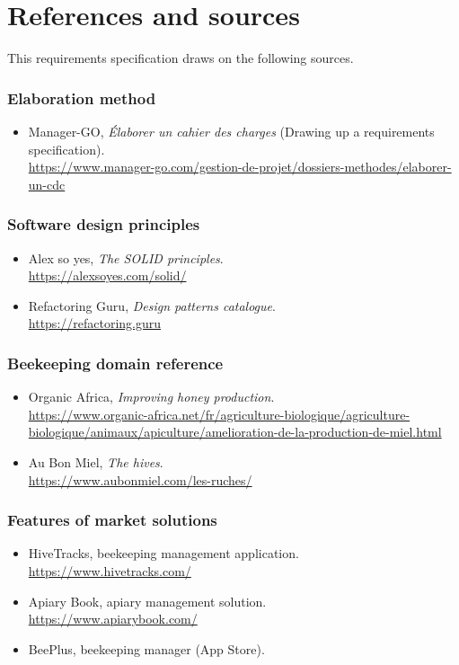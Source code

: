 \chapter{References and sources}
This requirements specification draws on the following sources.

\subsection*{Elaboration method}
\begin{itemize}
  \item Manager-GO, \emph{Élaborer un cahier des charges} (Drawing up a requirements specification).\\ \url{https://www.manager-go.com/gestion-de-projet/dossiers-methodes/elaborer-un-cdc}
\end{itemize}

\subsection*{Software design principles}
\begin{itemize}
  \item Alex so yes, \emph{The SOLID principles}.\\ \url{https://alexsoyes.com/solid/}
  \item Refactoring Guru, \emph{Design patterns catalogue}.\\ \url{https://refactoring.guru}
\end{itemize}

\subsection*{Beekeeping domain reference}
\begin{itemize}
  \item Organic Africa, \emph{Improving honey production}.\\ \url{https://www.organic-africa.net/fr/agriculture-biologique/agriculture-biologique/animaux/apiculture/amelioration-de-la-production-de-miel.html}
  \item Au Bon Miel, \emph{The hives}.\\ \url{https://www.aubonmiel.com/les-ruches/}
\end{itemize}

\subsection*{Features of market solutions}
\begin{itemize}
  \item HiveTracks, beekeeping management application.\\ \url{https://www.hivetracks.com/}
  \item Apiary Book, apiary management solution.\\ \url{https://www.apiarybook.com/}
  \item BeePlus, beekeeping manager (App Store).
\end{itemize}

